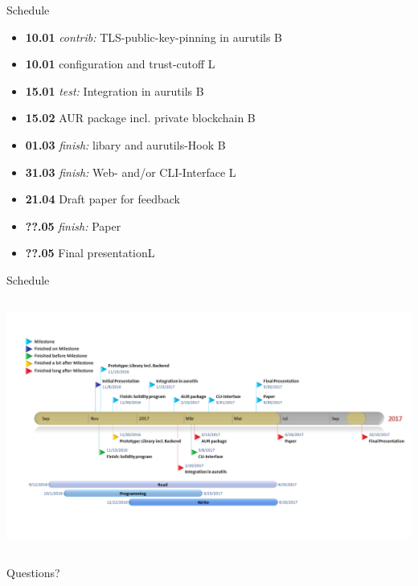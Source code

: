 \documentclass{beamer}
\begin{document}
\begin{frame}{Schedule}
	\begin{itemize}
		\item \textbf{10.01} \emph{contrib:} TLS-public-key-pinning in aurutils \hfill B
		\item \textbf{10.01} configuration and trust-cutoff \hfill L
		\item \textbf{15.01} \emph{test:} \alert{Integration in aurutils} \hfill B
		\item \textbf{15.02} \alert{AUR package} incl. private blockchain \hfill B
		\item \textbf{01.03} \emph{finish:} libary and aurutils-Hook \hfill B
		\item \textbf{31.03} \emph{finish:} Web- and/or CLI-Interface \hfill L
		\item \textbf{21.04} \alert{Draft paper} for feedback\hfill
		\item \textbf{??.05} \emph{finish:} Paper\hfill
		\item \textbf{??.05} Final presentation\hfill L
	\end{itemize}
\end{frame}

\begin{frame}{Schedule}
	\begin{columns}
		\column{\dimexpr\paperwidth}
		\includegraphics[width=0.9\paperwidth]{timeline}
	\end{columns}
\end{frame}

\begin{frame}[standout]
	Questions?
\end{frame}
\end{document}
